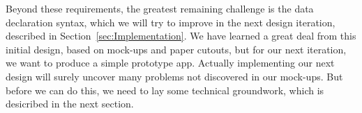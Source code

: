 Beyond these requirements, the greatest remaining challenge is the data declaration syntax, which we will try to improve in the next design iteration, described in Section~\ref{sec:Implementation}.
We have learned a great deal from this initial design, based on mock-ups and paper cutouts, but for our next iteration, we want to produce a simple prototype app.
Actually implementing our next design will surely uncover many problems not discovered in our mock-ups.
But before we can do this, we need to lay some technical groundwork, which is desicribed in the next section.